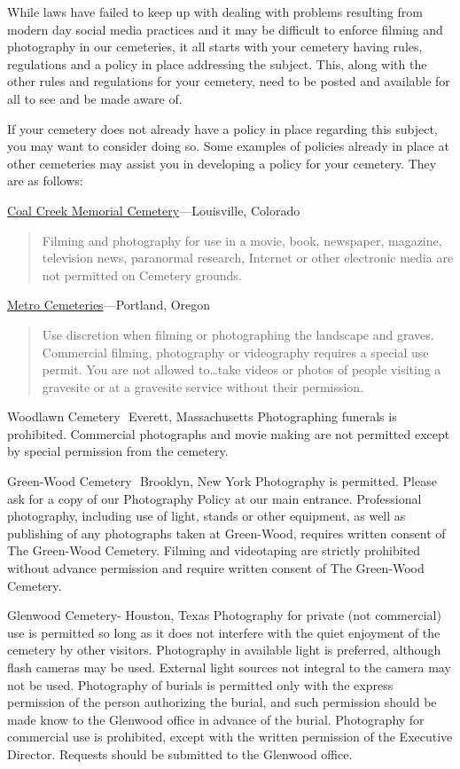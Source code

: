 \documentclass[]{article}
\begin{document}
While laws have failed to keep up with dealing with problems resulting
from modern day social media practices and it may be difficult to
enforce filming and photography in our cemeteries, it all starts with
your cemetery having rules, regulations and a policy in place addressing
the subject. This, along with the other rules and regulations for your
cemetery, need to be posted and available for all to see and be made
aware of.

If your cemetery does not already have a policy in place regarding this
subject, you may want to consider doing so. Some examples of policies
already in place at other cemeteries may assist you in developing a
policy for your cemetery. They are as follows:

\href{http://www.cityoflafayette.com/DocumentCenter/Home/View/443}{Coal
Creek Memorial Cemetery}---Louisville, Colorado

\begin{quote}
Filming and photography for use in a movie, book, newspaper, magazine,
television news, paranormal research, Internet or other electronic media
are not permitted on Cemetery grounds.
\end{quote}

\href{http://www.oregonmetro.gov/historic-cemeteries/visiting-cemeteries}{Metro
Cemeteries}---Portland, Oregon

\begin{quote}
Use discretion when filming or photographing the landscape and graves.
Commercial filming, photography or videography requires a special use
permit. You are not allowed to\ldots{}take videos or photos of people
visiting a gravesite or at a gravesite service without their permission.
\end{quote}

Woodlawn Cemetery  Everett, Massachusetts Photographing funerals is
prohibited. Commercial photographs and movie making are not permitted
except by special permission from the cemetery.

Green-Wood Cemetery  Brooklyn, New York Photography is permitted.
Please ask for a copy of our Photography Policy at our main entrance.
Professional photography, including use of light, stands or other
equipment, as well as publishing of any photographs taken at Green-Wood,
requires written consent of The Green-Wood Cemetery. Filming and
videotaping are strictly prohibited without advance permission and
require written consent of The Green-Wood Cemetery.

Glenwood Cemetery- Houston, Texas Photography for private (not
commercial) use is permitted so long as it does not interfere with the
quiet enjoyment of the cemetery by other visitors. Photography in
available light is preferred, although flash cameras may be used.
External light sources not integral to the camera may not be used.
Photography of burials is permitted only with the express permission of
the person authorizing the burial, and such permission should be made
know to the Glenwood office in advance of the burial. Photography for
commercial use is prohibited, except with the written permission of the
Executive Director. Requests should be submitted to the Glenwood office.
\end{document}
